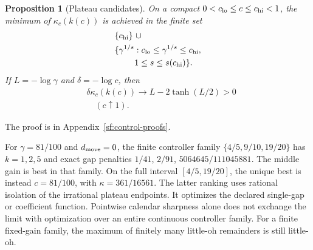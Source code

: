 \documentclass[journal]{IEEEtran}
\newtheorem{proposition}{Proposition}
\begin{document}
\begin{proposition}[Plateau candidates]\label{sf:settling}
On a compact $0<c_{\rm lo}\le c\le c_{\rm hi}<1$, the minimum of
$\kappa_c(k(c))$ is achieved in the finite set
\[
\begin{aligned}
&\{c_{\rm hi}\}\ \cup\\
&\{\gamma^{1/s}:c_{\rm lo}\le\gamma^{1/s}\le c_{\rm hi},\\
&\qquad\ 1\le s\le s(c_{\rm hi})\}.
\end{aligned}
\]
If $L=-\log\gamma$ and $\delta=-\log c$, then
\[
\begin{aligned}
&\delta\kappa_c(k(c))\longrightarrow L-2\tanh(L/2)>0\\
&\quad(c\uparrow1).
\end{aligned}
\]
\end{proposition}
The proof is in Appendix~\ref{sf:control-proofs}.

For $\gamma=81/100$ and $d_{\rm move}=0$, the finite controller family
$\{4/5,9/10,19/20\}$ has $k=1,2,5$ and exact gap penalties
$1/41$, $2/91$, $5064645/111045881$.
The middle gain is best in that family. On the full interval $[4/5,19/20]$,
the unique best is instead $c=81/100$, with $\kappa=361/16561$.
The latter ranking uses rational isolation of the irrational plateau endpoints.
It optimizes the declared single-gap or coefficient function. Pointwise
calendar sharpness alone does not exchange the limit with optimization over
an entire continuous controller family. For a finite fixed-gain family,
the maximum of finitely many little-oh remainders is still little-oh.
\end{document}
